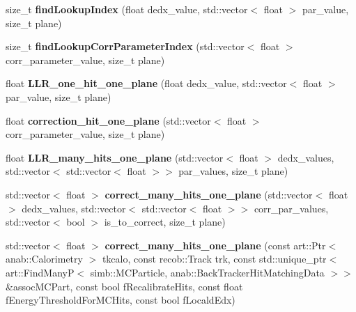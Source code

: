 \begin{DoxyCompactItemize}
\item 
size\+\_\+t {\bfseries find\+Lookup\+Index} (float dedx\+\_\+value, std\+::vector$<$ float $>$ par\+\_\+value, size\+\_\+t plane)\hypertarget{classsearchingfornues_1_1LLRPID_a891182e0af5e60e975e86ea5d2973e11}{}\label{classsearchingfornues_1_1LLRPID_a891182e0af5e60e975e86ea5d2973e11}

\item 
size\+\_\+t {\bfseries find\+Lookup\+Corr\+Parameter\+Index} (std\+::vector$<$ float $>$ corr\+\_\+parameter\+\_\+value, size\+\_\+t plane)\hypertarget{classsearchingfornues_1_1LLRPID_a855edcd3348bff52449abd4b90b42838}{}\label{classsearchingfornues_1_1LLRPID_a855edcd3348bff52449abd4b90b42838}

\item 
float {\bfseries L\+L\+R\+\_\+one\+\_\+hit\+\_\+one\+\_\+plane} (float dedx\+\_\+value, std\+::vector$<$ float $>$ par\+\_\+value, size\+\_\+t plane)\hypertarget{classsearchingfornues_1_1LLRPID_a615612fe3657b51e18bf1e514399363a}{}\label{classsearchingfornues_1_1LLRPID_a615612fe3657b51e18bf1e514399363a}

\item 
float {\bfseries correction\+\_\+hit\+\_\+one\+\_\+plane} (std\+::vector$<$ float $>$ corr\+\_\+parameter\+\_\+value, size\+\_\+t plane)\hypertarget{classsearchingfornues_1_1LLRPID_a06901bea0c1a2e5b9e3d4ce8b5a96e82}{}\label{classsearchingfornues_1_1LLRPID_a06901bea0c1a2e5b9e3d4ce8b5a96e82}

\item 
float {\bfseries L\+L\+R\+\_\+many\+\_\+hits\+\_\+one\+\_\+plane} (std\+::vector$<$ float $>$ dedx\+\_\+values, std\+::vector$<$ std\+::vector$<$ float $>$$>$ par\+\_\+values, size\+\_\+t plane)\hypertarget{classsearchingfornues_1_1LLRPID_ac8090da570daccff827fa96685b54f1e}{}\label{classsearchingfornues_1_1LLRPID_ac8090da570daccff827fa96685b54f1e}

\item 
std\+::vector$<$ float $>$ {\bfseries correct\+\_\+many\+\_\+hits\+\_\+one\+\_\+plane} (std\+::vector$<$ float $>$ dedx\+\_\+values, std\+::vector$<$ std\+::vector$<$ float $>$$>$ corr\+\_\+par\+\_\+values, std\+::vector$<$ bool $>$ is\+\_\+to\+\_\+correct, size\+\_\+t plane)\hypertarget{classsearchingfornues_1_1LLRPID_a2ac2b47463117811580f4e52f99bd1b2}{}\label{classsearchingfornues_1_1LLRPID_a2ac2b47463117811580f4e52f99bd1b2}

\item 
std\+::vector$<$ float $>$ {\bfseries correct\+\_\+many\+\_\+hits\+\_\+one\+\_\+plane} (const art\+::\+Ptr$<$ anab\+::\+Calorimetry $>$ tkcalo, const recob\+::\+Track trk, const std\+::unique\+\_\+ptr$<$ art\+::\+Find\+ManyP$<$ simb\+::\+M\+C\+Particle, anab\+::\+Back\+Tracker\+Hit\+Matching\+Data $>$$>$ \&assoc\+M\+C\+Part, const bool f\+Recalibrate\+Hits, const float f\+Energy\+Threshold\+For\+M\+C\+Hits, const bool f\+Locald\+Edx)\hypertarget{classsearchingfornues_1_1LLRPID_a709044e2cabf54be68f31bc3c038f21f}{}\label{classsearchingfornues_1_1LLRPID_a709044e2cabf54be68f31bc3c038f21f}

\end{DoxyCompactItemize}
